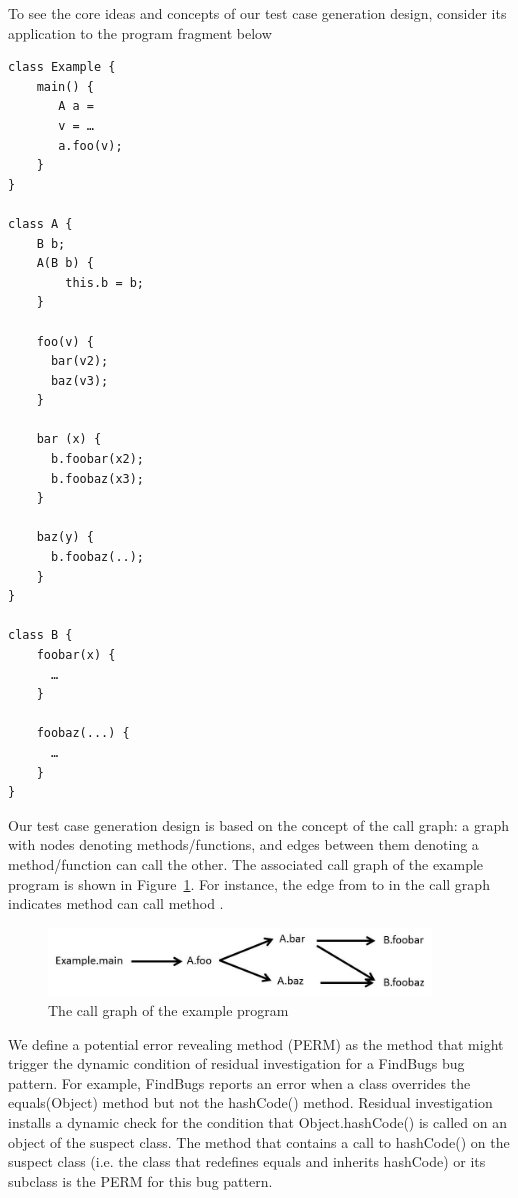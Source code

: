 To see the core ideas and concepts of our test case generation design, consider its application to the program fragment below

\begin{lstlisting}[style=JavaStyle, caption=An example Pig Latin program, label=lst:example, frame=none]
class Example {
	main() {
	   A a = 
	   v = …
	   a.foo(v);
	}
}

class A {
	B b;
	A(B b) {
		this.b = b;
	}

	foo(v) {
	  bar(v2);
	  baz(v3);
	}

	bar (x) {
	  b.foobar(x2);
	  b.foobaz(x3);
	}

	baz(y) {
	  b.foobaz(..);
	}
}

class B {
	foobar(x) {
	  …
	}

	foobaz(...) {
	  …
	}
}
\end{lstlisting}

Our test case generation design is based on the concept of the call graph: a graph with nodes denoting methods/functions, and edges between them denoting a method/function can call the other.  The associated call graph of the example program is shown in Figure~\ref{fig:call-graph-example}.  For instance, the edge from  to  in the call graph indicates method  can call method . 

\begin{figure}[h]
\centering
\includegraphics[width=4.0in, trim=0in 0in 0in 0in, clip]{call_graph.jpg}
\caption{The call graph of the example program}
\label{fig:call-graph-example}
\end{figure}

We define a potential error revealing method (PERM) as the method that might trigger the dynamic condition of residual investigation for a FindBugs bug pattern.  For example, FindBugs reports an error when a class overrides the equals(Object) method but not the hashCode() method.  Residual investigation installs a dynamic check for the condition that Object.hashCode() is called on an object of the suspect class. The method that contains a call to hashCode() on the suspect class (i.e. the class that redefines equals and inherits hashCode) or its subclass is the PERM for this bug pattern.  


